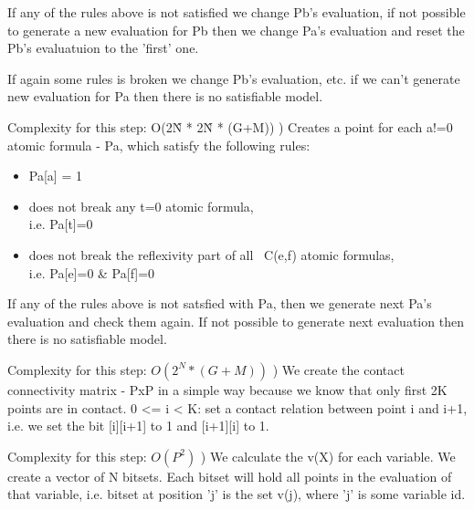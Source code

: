 \documentclass{article}
\begin{document}
				If any of the rules above is not satisfied we change Pb's evaluation, 
				if not possible to generate a new evaluation for Pb then we change 
				Pa's evaluation and reset the Pb's evaluatuion to the 'first' one.

				If again some rules is broken we change Pb's evaluation, etc. 
				if we can't generate new evaluation for Pa then there is no satisfiable model.
				\newline

				Complexity for this step: O(2\^N * 2\^N * (G+M))
				\newline
				) Creates a point for each a!=0 atomic formula - Pa, which satisfy the following rules:
				\begin{itemize}
					\item Pa[a] = 1
					\item does not break any t=0 atomic formula, \\
						i.e. Pa[t]=0
					\item does not break the reflexivity part of all ~C(e,f) atomic formulas, \\
						i.e. Pa[e]=0 \& Pa[f]=0
				\end{itemize}

				If any of the rules above is not satsfied with Pa, 
				then we generate next Pa's evaluation and check them again. 
				If not possible to generate next evaluation then there is no satisfiable model.
				\newline

				Complexity for this step: $O(2^N * (G+M))$
				\newline
				) We create the contact connectivity matrix - 
				PxP in a simple way because we know that only first 2K points are in contact.
				0 <= i < K: set a contact relation between point i and i+1, 
				i.e. we set the bit [i][i+1] to 1 and [i+1][i] to 1.
				\newline

				Complexity for this step: $O(P^2)$
				\newline
				) We calculate the v(X) for each variable.
				We create a vector of N bitsets. 
				Each bitset will hold all points in the evaluation of that variable, 
				i.e. bitset at position 'j' is the set v(j), where 'j' is some variable id.
				\newline
\end{document}
